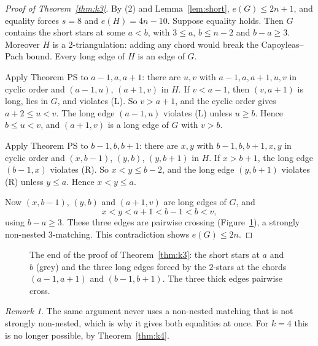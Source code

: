 \documentclass[11pt]{amsart}
\theoremstyle{definition}\newtheorem{problem}{Problem}
\theoremstyle{remark}\newtheorem*{remark}{Remark}
\begin{document}
\begin{proof}[Proof of Theorem~\ref{thm:k3}]
By (2) and Lemma~\ref{lem:short}, $e(G)\le 2n+1$, and equality forces $s=8$ and $e(H)=4n-10$. Suppose equality
holds. Then $G$ contains the short stars at some $a<b$, with $3\le a$, $b\le n-2$ and $b-a\ge3$. Moreover $H$ is a
$2$-triangulation: adding any chord would break the Capoyleas--Pach bound. Every long edge of $H$ is an edge of $G$.

Apply Theorem PS to $a-1,a,a+1$: there are $u,v$ with $a-1,a,a+1,u,v$ in cyclic order and $(a-1,u)$, $(a+1,v)$ in
$H$. If $v<a-1$, then $(v,a+1)$ is long, lies in $G$, and violates (L). So $v>a+1$, and the cyclic order gives
$a+2\le u<v$. The long edge $(a-1,u)$ violates (L) unless $u\ge b$. Hence $b\le u<v$, and $(a+1,v)$ is a long edge of
$G$ with $v>b$.

Apply Theorem PS to $b-1,b,b+1$: there are $x,y$ with $b-1,b,b+1,x,y$ in cyclic order and $(x,b-1)$, $(y,b)$,
$(y,b+1)$ in $H$. If $x>b+1$, the long edge $(b-1,x)$ violates (R). So $x<y\le b-2$, and the long edge $(y,b+1)$
violates (R) unless $y\le a$. Hence $x<y\le a$.

Now $(x,b-1)$, $(y,b)$ and $(a+1,v)$ are long edges of $G$, and
\[
x<y<a+1<b-1<b<v,
\]
using $b-a\ge3$. These three edges are pairwise crossing (Figure~\ref{fig:end}), a strongly non-nested
$3$-matching. This contradiction shows $e(G)\le2n$.
\end{proof}

\begin{figure}[ht]
\centering
{}
\caption{The end of the proof of Theorem~\ref{thm:k3}: the short stars at $a$ and $b$ (grey) and the three long edges
forced by the $2$-stars at the chords $(a-1,a+1)$ and $(b-1,b+1)$. The three thick edges pairwise cross.}
\label{fig:end}
\end{figure}

\begin{remark}
The same argument never uses a non-nested matching that is not strongly non-nested, which is why it gives both
equalities at once. For $k=4$ this is no longer possible, by Theorem~\ref{thm:k4}.
\end{remark}
\end{document}
